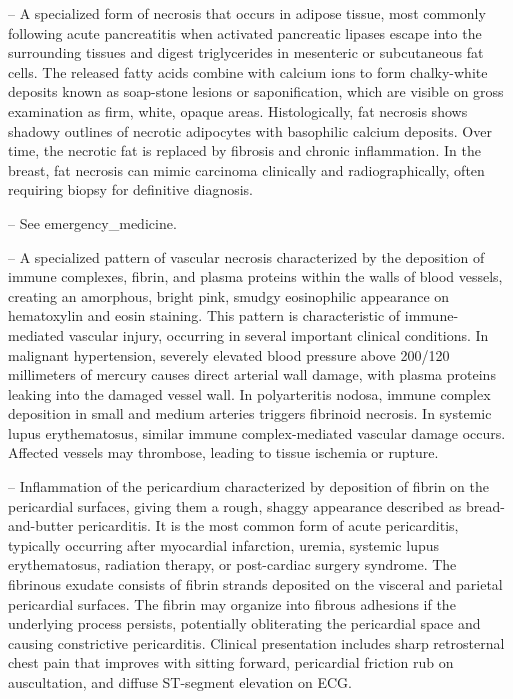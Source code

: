 -- A specialized form of necrosis that occurs in adipose tissue, most commonly following acute pancreatitis when activated pancreatic lipases escape into the surrounding tissues and digest triglycerides in mesenteric or subcutaneous fat cells. The released fatty acids combine with calcium ions to form chalky-white deposits known as soap-stone lesions or saponification, which are visible on gross examination as firm, white, opaque areas. Histologically, fat necrosis shows shadowy outlines of necrotic adipocytes with basophilic calcium deposits. Over time, the necrotic fat is replaced by fibrosis and chronic inflammation. In the breast, fat necrosis can mimic carcinoma clinically and radiographically, often requiring biopsy for definitive diagnosis.

-- See emergency\_medicine.

-- A specialized pattern of vascular necrosis characterized by the deposition of immune complexes, fibrin, and plasma proteins within the walls of blood vessels, creating an amorphous, bright pink, smudgy eosinophilic appearance on hematoxylin and eosin staining. This pattern is characteristic of immune-mediated vascular injury, occurring in several important clinical conditions. In malignant hypertension, severely elevated blood pressure above 200/120 millimeters of mercury causes direct arterial wall damage, with plasma proteins leaking into the damaged vessel wall. In polyarteritis nodosa, immune complex deposition in small and medium arteries triggers fibrinoid necrosis. In systemic lupus erythematosus, similar immune complex-mediated vascular damage occurs. Affected vessels may thrombose, leading to tissue ischemia or rupture.

-- Inflammation of the pericardium characterized by deposition of fibrin on the pericardial surfaces, giving them a rough, shaggy appearance described as bread-and-butter pericarditis. It is the most common form of acute pericarditis, typically occurring after myocardial infarction, uremia, systemic lupus erythematosus, radiation therapy, or post-cardiac surgery syndrome. The fibrinous exudate consists of fibrin strands deposited on the visceral and parietal pericardial surfaces. The fibrin may organize into fibrous adhesions if the underlying process persists, potentially obliterating the pericardial space and causing constrictive pericarditis. Clinical presentation includes sharp retrosternal chest pain that improves with sitting forward, pericardial friction rub on auscultation, and diffuse ST-segment elevation on ECG.

